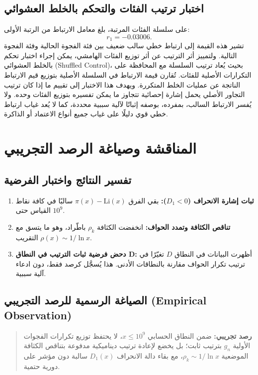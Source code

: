 \documentclass[12pt,a4paper]{article}
\begin{document}
\subsection{اختبار ترتيب الفئات والتحكم بالخلط العشوائي}
على سلسلة الفئات المرتبة، بلغ معامل الارتباط من الرتبة الأولى:
\[
r_1=-0.03006.
\]
تشير هذه القيمة إلى ارتباط خطي سالب ضعيف بين فئة الفجوة الحالية وفئة الفجوة التالية. ولتمييز أثر الترتيب عن أثر توزيع الفئات الهامشي، يمكن إجراء اختبار تحكم بالخلط العشوائي (\textenglish{Shuffled Control})، بحيث يُعاد ترتيب السلسلة مع المحافظة على التكرارات الأصلية للفئات.
تُقارن قيمة الارتباط في السلسلة الأصلية بتوزيع قيم الارتباط الناتجة عن عمليات الخلط المتكررة. ويهدف هذا الاختبار إلى تقييم ما إذا كان ترتيب التجاور الأصلي يحمل إشارة إحصائية تتجاوز ما يمكن تفسيره بتوزيع الفئات وحده.
ولا يُفسر الارتباط السالب، بمفرده، بوصفه إثباتًا لآلية سببية محددة، كما لا يُعد غياب ارتباط خطي قوي دليلًا على غياب جميع أنواع الاعتماد أو الذاكرة.

\section{المناقشة وصياغة الرصد التجريبي}
\subsection{تفسير النتائج واختبار الفرضية}
\begin{enumerate}
\item \textbf{ثبات إشارة الانحراف ($D_1 < 0$):} بقي الفرق $\pi(x) - \mathrm{Li}(x)$ سالبًا في كافة نقاط القياس حتى $10^9$.
\item \textbf{تناقص الكثافة وتمدد الحواف:} انخفضت الكثافة $\rho_k$ باطّراد، وهو ما يتسق مع التقريب $\rho(x) \sim 1/\ln x$.
\item \textbf{دحض فرضية ثبات الترتيب في النطاق \textenglish{D}:} أظهرت البيانات في النطاق $D$ تغيّرًا في ترتيب تكرار الحواف مقارنة بالنطاقات الأدنى. هذا يُسجَّل كرصد فقط، دون ادعاء آلية سببية.
\end{enumerate}

\subsection{الصياغة الرسمية للرصد التجريبي (\textenglish{Empirical Observation})}
\begin{quote}
\textbf{رصد تجريبي:} ضمن النطاق الحسابي $x \leq 10^9$، لا يحتفظ توزيع تكرارات الفجوات الأولية $g_n$ بترتيب ثابت؛ بل يخضع لإعادة ترتيب ديناميكية مدفوعة بتناقص الكثافة الموضعية $\rho_k \sim 1/\ln x$، مع بقاء دالة الانحراف $D_1(x)$ سالبة دون مؤشر على دورية حتمية.
\end{quote}
\end{document}
